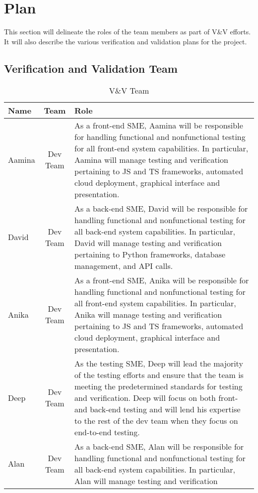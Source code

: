 \documentclass[12pt, titlepage]{article}
\begin{document}
\section{Plan}
This section will delineate the roles of the team members as part of V\&V efforts. 
It will also describe the various verification and validation plans for the project.

\subsection{Verification and Validation Team}
\begin{table}[H]
    \caption{ V\&V Team}
    \begin{tabular}{|p{1.4cm}|c|p{12.5cm}|}
        \hline
        \textbf{Name} & \textbf{Team} & \textbf{Role} \\
        \hline 
        Aamina & Dev Team & As a front-end SME, Aamina will be responsible for handling functional and 
        nonfunctional testing for all front-end system capabilities. In particular, Aamina will manage 
        testing and verification pertaining to JS and TS frameworks, automated cloud deployment, graphical interface and presentation.\\
        \hline 
        David & Dev Team & As a back-end SME, David will be responsible for handling functional and nonfunctional testing 
        for all back-end system capabilities. In particular, David will manage testing and verification 
        pertaining to Python frameworks, database management, and API calls. \\
        \hline
        Anika & Dev Team & As a front-end SME, Anika will be responsible for handling functional and 
        nonfunctional testing for all front-end system capabilities. In particular, Anika will manage 
        testing and verification pertaining to JS and TS frameworks, automated cloud deployment, graphical interface and presentation.\\
        \hline
        Deep & Dev Team & As the testing SME, Deep will lead the majority of the testing efforts and ensure that the team is meeting
        the predetermined standards for testing and verification. Deep will focus on both
        front- and back-end testing and will lend his expertise to the rest of the dev team when they focus on end-to-end testing. \\
        \hline
        Alan & Dev Team & As a back-end SME, Alan will be responsible for handling functional and nonfunctional testing 
        for all back-end system capabilities. In particular, Alan will manage testing and verification 

\end{tabular}
\end{table}
\end{document}
